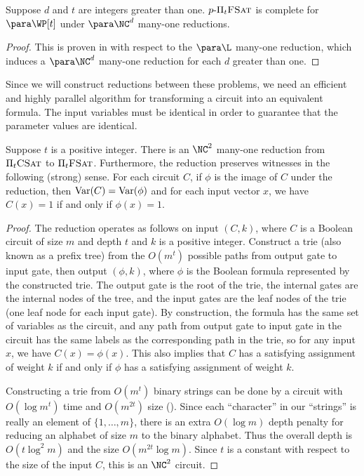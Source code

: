 \begin{theorem}\label{thm:ppifsat}
  Suppose $d$ and $t$ are integers greater than one.
  $p \textnormal{-} \Pi_t \textsc{FSat}$ is complete for $\para \WP[t]$ under $\para \NC^d$ many-one reductions.
\end{theorem}
\begin{proof}
  This is proven in \autocite[Theorem~4.1]{df92} with respect to the $\para \L$ many-one reduction, which induces a $\para \NC^d$ many-one reduction for each $d$ greater than one.
\end{proof}


Since we will construct reductions between these problems, we need an efficient and highly parallel algorithm for transforming a circuit into an equivalent formula.
The input variables must be identical in order to guarantee that the parameter values are identical.

\begin{lemma}\label{lem:circuittoformula}
  Suppose $t$ is a positive integer.
  There is an $\NC^2$ many-one reduction from $\Pi_t \textsc{CSat}$ to $\Pi_t \textsc{FSat}$.
  Furthermore, the reduction preserves witnesses in the following (strong) sense.
  For each circuit $C$, if $\phi$ is the image of $C$ under the reduction, then $\operatorname{Var}(C) = \operatorname{Var}(\phi)$ and for each input vector $x$, we have $C(x) = 1$ if and only if $\phi(x) = 1$.
\end{lemma}
\begin{proof}
  The reduction operates as follows on input $(C, k)$, where $C$ is a Boolean circuit of size $m$ and depth $t$ and $k$ is a positive integer.
  Construct a trie (also known as a prefix tree) from the $O(m^t)$ possible paths from output gate to input gate, then output $(\phi, k)$, where $\phi$ is the Boolean formula represented by the constructed trie.
  The output gate is the root of the trie, the internal gates are the internal nodes of the tree, and the input gates are the leaf nodes of the trie (one leaf node for each input gate).
  By construction, the formula has the same set of variables as the circuit, and any path from output gate to input gate in the circuit has the same labels as the corresponding path in the trie, so for any input $x$, we have $C(x) = \phi(x)$.
  This also implies that $C$ has a satisfying assignment of weight $k$ if and only if $\phi$ has a satisfying assignment of weight $k$.

  Constructing a trie from $O(m^t)$ binary strings can be done by a circuit with $O(\log m^t)$ time and $O(m^{2t})$ size \autocite{lv86} ().
  Since each ``character'' in our ``strings'' is really an element of $\{1, \dotsc, m\}$, there is an extra $O(\log m)$ depth penalty for reducing an alphabet of size $m$ to the binary alphabet.
  Thus the overall depth is $O(t \log^2 m)$ and the size $O(m^{2t} \log m)$.
  Since $t$ is a constant with respect to the size of the input $C$, this is an $\NC^2$ circuit.
\end{proof}

